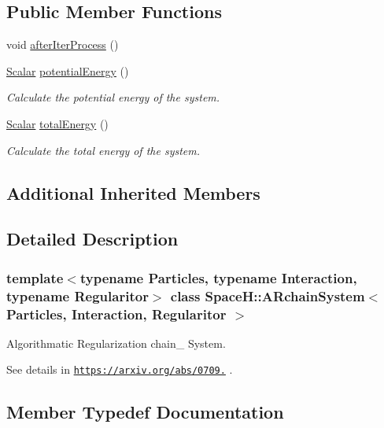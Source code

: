 \subsection*{Public Member Functions}
\begin{DoxyCompactItemize}
\item 
void \mbox{\hyperlink{class_space_h_1_1_a_rchain_system_a2a0f231485f166cf9037a06a4b83e8ca}{after\+Iter\+Process}} ()
\item 
\mbox{\hyperlink{class_space_h_1_1_a_rchain_system_acaaa03940944dd5d6978c575888dd308}{Scalar}} \mbox{\hyperlink{class_space_h_1_1_a_rchain_system_adf6a2220ead064e01251a74ecbd7eb41}{potential\+Energy}} ()
\begin{DoxyCompactList}\small\item\em Calculate the potential energy of the system. \end{DoxyCompactList}\item 
\mbox{\hyperlink{class_space_h_1_1_a_rchain_system_acaaa03940944dd5d6978c575888dd308}{Scalar}} \mbox{\hyperlink{class_space_h_1_1_a_rchain_system_a069b5ae075413b26fa177df689bf044d}{total\+Energy}} ()
\begin{DoxyCompactList}\small\item\em Calculate the total energy of the system. \end{DoxyCompactList}\end{DoxyCompactItemize}
\subsection*{Additional Inherited Members}


\subsection{Detailed Description}
\subsubsection*{template$<$typename Particles, typename Interaction, typename Regularitor$>$\newline
class Space\+H\+::\+A\+Rchain\+System$<$ Particles, Interaction, Regularitor $>$}

Algorithmatic Regularization chain_ System.

See details in \href{https://arxiv.org/abs/0709.3367}{\tt https\+://arxiv.\+org/abs/0709.} . 

\subsection{Member Typedef Documentation}
\mbox{\label{class_space_h_1_1_a_rchain_system_a406ea4f9fd417879ac32c691bb705de4}} 
